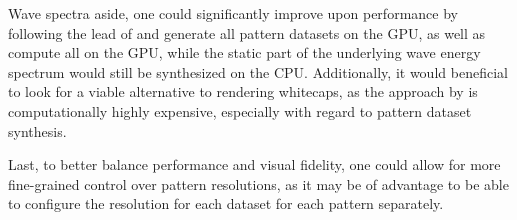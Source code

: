 Wave spectra aside, one could significantly improve upon performance by
following the lead of \cite{misc:oceanlightingfft} and generate all
pattern datasets on the GPU, as well as compute all \InvDiscreteFourierTransforms
on the GPU, while the static part of the underlying wave energy spectrum
would still be synthesized on the CPU. Additionally, it would beneficial
to look for a viable alternative to rendering whitecaps, as the approach
by \citet{article:whitecaps} is computationally highly expensive,
especially with regard to pattern dataset synthesis.


Last, to better balance performance and visual fidelity, one could allow
for more fine-grained control over pattern resolutions, as it may be
of advantage to be able to configure the resolution for each dataset for
each pattern separately.

